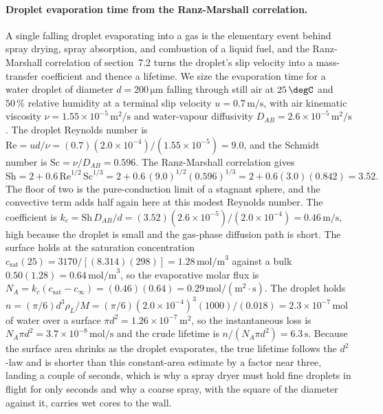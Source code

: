 \paragraph{Droplet evaporation time from the Ranz-Marshall correlation.} A
single falling droplet evaporating into a gas is the elementary event behind
spray drying, spray absorption, and combustion of a liquid fuel, and the
Ranz-Marshall correlation of section~7.2 turns the droplet's slip velocity into
a mass-transfer coefficient and thence a lifetime. We size the evaporation time
for a water droplet of diameter $d = 200\,\si{\micro\meter}$ falling through
still air at $25\,\degC$ and $50\,\%$ relative humidity at a terminal slip
velocity $u = 0.7\,\text{m/s}$, with air kinematic viscosity $\nu = 1.55\times
10^{-5}\,\si{\meter\squared\per\second}$ and water-vapour diffusivity
$D_{AB} = 2.6\times 10^{-5}\,\si{\meter\squared\per\second}$. The droplet
Reynolds number is $\text{Re} = ud/\nu = (0.7)(2.0\times 10^{-4})/(1.55\times
10^{-5}) = 9.0$, and the Schmidt number is $\text{Sc} = \nu/D_{AB} = 0.596$.
The Ranz-Marshall correlation gives
\[
\text{Sh} = 2 + 0.6\,\text{Re}^{1/2}\,\text{Sc}^{1/3} =
2 + 0.6\,(9.0)^{1/2}(0.596)^{1/3} = 2 + 0.6(3.0)(0.842) = 3.52.
\]
The floor of two is the pure-conduction limit of a stagnant sphere, and the
convective term adds half again here at this modest Reynolds number. The
coefficient is $k_c = \text{Sh}\,D_{AB}/d = (3.52)(2.6\times 10^{-5})/
(2.0\times 10^{-4}) = 0.46\,\text{m/s}$, high because the droplet is small and
the gas-phase diffusion path is short. The surface holds at the saturation
concentration $c_{\text{sat}}(25) = 3170/[(8.314)(298)] = 1.28\,\text{mol/m}^3$
against a bulk $0.50(1.28) = 0.64\,\text{mol/m}^3$, so the evaporative molar
flux is $N_A = k_c(c_{\text{sat}}-c_\infty) = (0.46)(0.64) = 0.29\,\text{mol}/
(\text{m}^2\cdot\text{s})$. The droplet holds
$n = (\pi/6)d^3\rho_L/M = (\pi/6)(2.0\times 10^{-4})^3(1000)/(0.018) =
2.3\times 10^{-7}\,\text{mol}$ of water over a surface $\pi d^2 =
1.26\times 10^{-7}\,\text{m}^2$, so the instantaneous loss is $N_A\pi d^2 =
3.7\times 10^{-8}\,\text{mol/s}$ and the crude lifetime is $n/(N_A\pi d^2) =
6.3\,\text{s}$. Because the surface area shrinks as the droplet evaporates, the
true lifetime follows the $d^2$-law and is shorter than this constant-area
estimate by a factor near three, landing a couple of seconds, which is why a
spray dryer must hold fine droplets in flight for only seconds and why a coarse
spray, with the square of the diameter against it, carries wet cores to the
wall.

